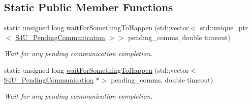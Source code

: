 \subsection*{Static Public Member Functions}
\begin{DoxyCompactItemize}
\item 
static unsigned long \hyperlink{classwrench_1_1_s4_u___pending_communication_a161f81593a2998e5811eed28dea1efc0}{wait\+For\+Something\+To\+Happen} (std\+::vector$<$ std\+::unique\+\_\+ptr$<$ \hyperlink{classwrench_1_1_s4_u___pending_communication}{S4\+U\+\_\+\+Pending\+Communication} $>$$>$ pending\+\_\+comms, double timeout)
\begin{DoxyCompactList}\small\item\em Wait for any pending communication completion. \end{DoxyCompactList}\item 
static unsigned long \hyperlink{classwrench_1_1_s4_u___pending_communication_af599fef5903e9e1471deead0d4f5ca38}{wait\+For\+Something\+To\+Happen} (std\+::vector$<$ \hyperlink{classwrench_1_1_s4_u___pending_communication}{S4\+U\+\_\+\+Pending\+Communication} $\ast$$>$ pending\+\_\+comms, double timeout)
\begin{DoxyCompactList}\small\item\em Wait for any pending communication completion. \end{DoxyCompactList}\end{DoxyCompactItemize}
